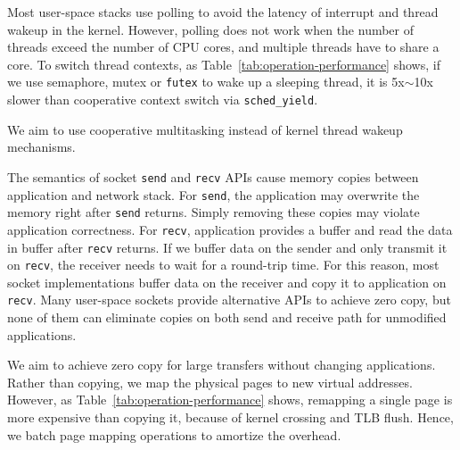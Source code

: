 Most user-space stacks use polling to avoid the latency of interrupt and thread wakeup in the kernel.
However, polling does not work when the number of threads exceed the number of CPU cores, and multiple threads have to share a core.
To switch thread contexts, as Table~\ref{tab:operation-performance} shows, if we use semaphore, mutex or \texttt{futex} to wake up a sleeping thread, it is 5x$\sim$10x slower than cooperative context switch via \texttt{sched\_yield}.

We aim to use cooperative multitasking instead of kernel thread wakeup mechanisms.



The semantics of socket \texttt{send} and \texttt{recv} APIs cause memory copies between application and network stack. For \texttt{send}, the application may overwrite the memory right after \texttt{send} returns. Simply removing these copies may violate application correctness. For \texttt{recv}, application provides a buffer and read the data in buffer after \texttt{recv} returns. If we buffer data on the sender and only transmit it on \texttt{recv}, the receiver needs to wait for a round-trip time. For this reason, most socket implementations buffer data on the receiver and copy it to application on \texttt{recv}.
Many user-space sockets provide alternative APIs to achieve zero copy, but none of them can eliminate copies on both send and receive path for unmodified applications.

We aim to achieve zero copy for large transfers without changing applications. Rather than copying, we map the physical pages to new virtual addresses. However, as Table~\ref{tab:operation-performance} shows, remapping a single page is more expensive than copying it, because of kernel crossing and TLB flush. Hence, we batch page mapping operations to amortize the overhead.






